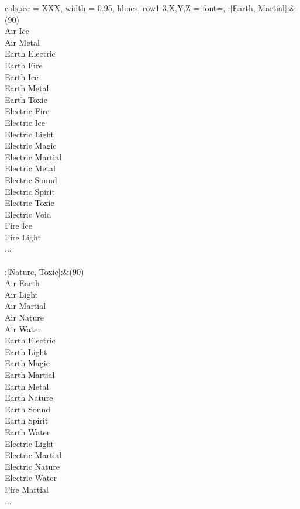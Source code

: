 \begin{longtblr}[
	caption = {2v2 Attacking Effective},
	label = {2v2-Attacking-Effective},
]{
	colspec = {XXX}, width = 0.95\linewidth,
	hlines,
	row{1-3,X,Y,Z} = {font=\bfseries},
}
	:[Earth, Martial]:&{(90)\\
	Air Ice \\
	Air Metal \\
	Earth Electric \\
	Earth Fire \\
	Earth Ice \\
	Earth Metal \\
	Earth Toxic \\
	Electric Fire \\
	Electric Ice \\
	Electric Light \\
	Electric Magic \\
	Electric Martial \\
	Electric Metal \\
	Electric Sound \\
	Electric Spirit \\
	Electric Toxic \\
	Electric Void \\
	Fire Ice \\
	Fire Light \\
	...\\
	}\\

	:[Nature, Toxic]:&{(90)\\
	Air Earth \\
	Air Light \\
	Air Martial \\
	Air Nature \\
	Air Water \\
	Earth Electric \\
	Earth Light \\
	Earth Magic \\
	Earth Martial \\
	Earth Metal \\
	Earth Nature \\
	Earth Sound \\
	Earth Spirit \\
	Earth Water \\
	Electric Light \\
	Electric Martial \\
	Electric Nature \\
	Electric Water \\
	Fire Martial \\
	...\\
	}\\


\end{longtblr}
